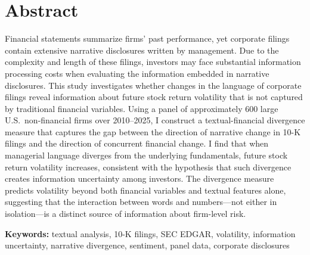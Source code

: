 \chapter*{Abstract}

Financial statements summarize firms' past performance, yet corporate filings
contain extensive narrative disclosures written by management. Due to the
complexity and length of these filings, investors may face substantial
information processing costs when evaluating the information embedded in
narrative disclosures. This study investigates whether changes in the language
of corporate filings reveal information about future stock return volatility
that is not captured by traditional financial variables. Using a panel of
approximately 600 large U.S.\ non-financial firms over 2010--2025, I construct
a textual-financial divergence measure that captures the gap between the
direction of narrative change in 10-K filings and the direction of concurrent
financial change. I find that when managerial language diverges from the
underlying fundamentals, future stock return volatility increases, consistent
with the hypothesis that such divergence creates information uncertainty among
investors. The divergence measure predicts volatility beyond both financial
variables and textual features alone, suggesting that the interaction between
words and numbers---not either in isolation---is a distinct source of
information about firm-level risk.

\vspace{1cm}
\noindent\textbf{Keywords:} textual analysis, 10-K filings, SEC EDGAR,
volatility, information uncertainty, narrative divergence, sentiment,
panel data, corporate disclosures
